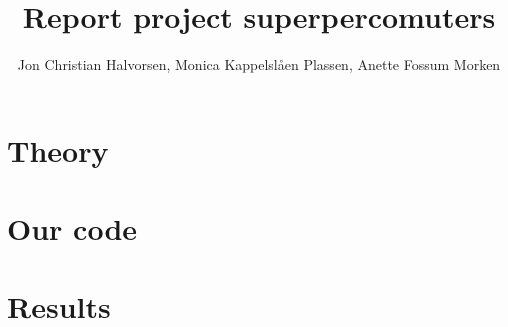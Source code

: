 \documentclass[10pt, a4paper]{article} %
\title{Report project superpercomuters}
\author[]{Jon Christian Halvorsen, Monica Kappelslåen Plassen, Anette Fossum Morken}
\date{}
\begin{document}
\maketitle



\section*{Theory}



\section*{Our code}

 



\section*{Results}



%
%
\end{document}
